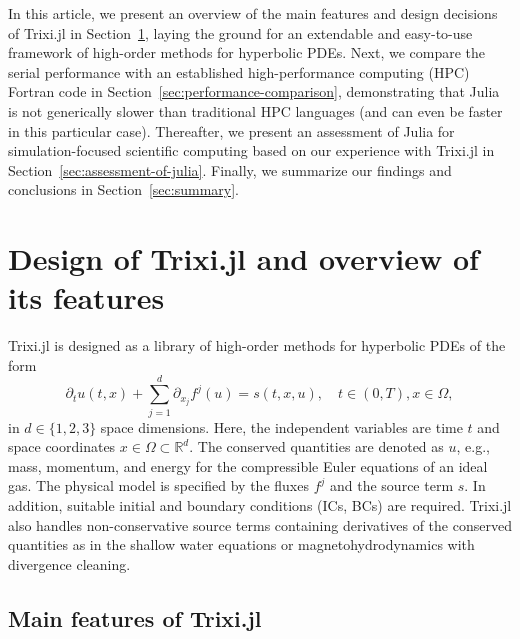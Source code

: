\documentclass{juliacon}
\makeatletter
\newcommand{\eg}[0]{{e.g.\@}\xspace}
\newcommand{\trixi}{Trixi.jl\xspace}
\makeatother
\begin{document}
In this article, we present an overview of the main features and design decisions
of \trixi in Section~\ref{sec:design-of-trixi}, laying the ground for an extendable
and easy-to-use framework of high-order methods for hyperbolic PDEs. Next, we
compare the serial performance with an established high-performance computing (HPC) Fortran code in
Section~\ref{sec:performance-comparison}, demonstrating that Julia is not generically
slower than traditional HPC languages (and can even be faster in this particular case).
Thereafter, we present an assessment of Julia for simulation-focused scientific
computing based on our experience with \trixi in Section~\ref{sec:assessment-of-julia}.
Finally, we summarize our findings and conclusions in Section~\ref{sec:summary}.



\section{Design of \trixi and overview of its features}
\label{sec:design-of-trixi}

\trixi is designed as a library of high-order methods for hyperbolic PDEs of
the form
\begin{equation}
\label{eq:hcl}
  \partial_t u(t, x) + \sum_{j=1}^d \partial_{x_j} f^j(u) = s(t, x, u),
  \quad t \in (0, T), x \in \Omega, 
\end{equation}
in $d \in \{1, 2, 3\}$ space dimensions. Here, the independent variables are
time $t$ and space coordinates $x \in \Omega \subset \mathbb{R}^d$. The conserved
quantities are denoted as $u$, \eg, mass, momentum, and energy for the compressible
Euler equations of an ideal gas.
The physical model is specified by the fluxes $f^j$ and the source term $s$.
In addition, suitable initial and boundary conditions (ICs, BCs) are required.
\trixi also handles non-conservative source terms containing derivatives of the
conserved quantities as in the shallow water equations or magnetohydrodynamics
with divergence cleaning.


\subsection{Main features of \trixi}
\end{document}
